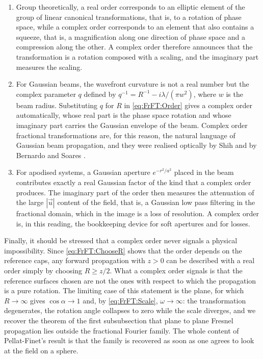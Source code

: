 			\begin{enumerate}
				\item Group theoretically, a real order corresponds to an elliptic element of the group of linear canonical transformations, that is, to a rotation of phase space, while a complex order corresponds to an element that also contains a squeeze, that is, a magnification along one direction of phase space and a compression along the other. A complex order therefore announces that the transformation is a rotation composed with a scaling, and the imaginary part measures the scaling.
				\item For Gaussian beams, the wavefront curvature is not a real number but the complex parameter $q$ defined by $q^{-1} = R^{-1} - i\lambda/(\pi w^{2})$, where $w$ is the beam radius. Substituting $q$ for $R$ in \eqref{eq:FrFT:Order} gives a complex order automatically, whose real part is the phase space rotation and whose imaginary part carries the Gaussian envelope of the beam. Complex order fractional transformations are, for this reason, the natural language of Gaussian beam propagation, and they were realised optically by Shih \citeyearpar{shih1995optical} and by Bernardo and Soares \citeyearpar{bernardo1996optical}.
				\item For apodised systems, a Gaussian aperture $e^{-r^{2}/a^{2}}$ placed in the beam contributes exactly a real Gaussian factor of the kind that a complex order produces. The imaginary part of the order then measures the attenuation of the large $|\vec{u}|$ content of the field, that is, a Gaussian low pass filtering in the fractional domain, which in the image is a loss of resolution. A complex order is, in this reading, the bookkeeping device for soft apertures and for losses.
			\end{enumerate}

			Finally, it should be stressed that a complex order never signals a physical impossibility. Since \eqref{eq:FrFT:ChooseR} shows that the order depends on the reference caps, any forward propagation with $z>0$ can be described with a real order simply by choosing $R \geq z/2$. What a complex order signals is that the reference surfaces chosen are not the ones with respect to which the propagation is a pure rotation. The limiting case of this statement is the plane, for which $R\to\infty$ gives $\cos\alpha\to1$ and, by \eqref{eq:FrFT:Scale}, $\omega\to\infty$: the transformation degenerates, the rotation angle collapses to zero while the scale diverges, and we recover the theorem of the first subsubsection that plane to plane Fresnel propagation lies outside the fractional Fourier family. The whole content of Pellat-Finet's result is that the family is recovered as soon as one agrees to look at the field on a sphere.
